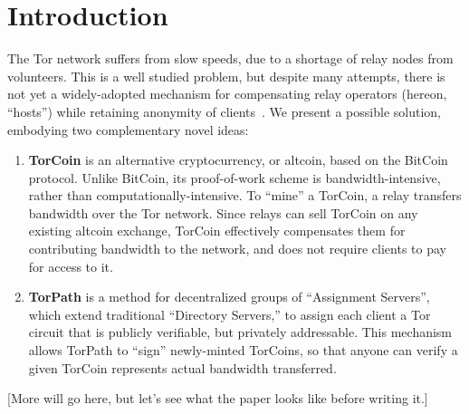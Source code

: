 \section{Introduction}

The Tor network suffers from slow speeds,
due to a shortage of relay nodes from volunteers.
This is a well studied problem, but despite many attempts,
there is not yet a widely-adopted mechanism
for compensating relay operators (hereon, ``hosts'')
while retaining anonymity of clients~\cite{raykova-pet2008, wpes09-xpay, incentives-fc10, ccs10-braids, acsac11-tortoise, jansen2013lira, johnson2013onions}.
We present a possible solution, embodying two complementary novel ideas:

\begin{enumerate}
\item \textbf{TorCoin} is an alternative cryptocurrency, or altcoin, based on the BitCoin protocol. Unlike BitCoin, its proof-of-work scheme is bandwidth-intensive, rather than computationally-intensive. To ``mine'' a TorCoin, a relay transfers bandwidth over the Tor network. Since relays can sell TorCoin on any existing altcoin exchange, TorCoin effectively compensates them for contributing bandwidth to the network, and does not require clients to pay for access to it.

\item \textbf{TorPath} is a method for decentralized groups of ``Assignment Servers'', which extend traditional ``Directory Servers,'' to assign each client a Tor circuit that is publicly verifiable, but privately addressable. This mechanism allows TorPath to ``sign'' newly-minted TorCoins, so that anyone can verify a given TorCoin represents actual bandwidth transferred. 
\end{enumerate}

[More will go here, but let's see what the paper looks like before writing it.]
